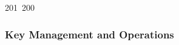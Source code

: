 201~200~\documentclass{article}
\begin{document}
\begin{itemize}
	                                                                                                                                                                                                                                                                                                	                                                                                                                                        	    	                                                                                                	                                                                                                                                                                                                                                                                                                                                	                                                                        	                                                                        	                                                                                                                                        	                                                                                                                                                                                    \end{itemize}

	                                                                                                                                                                                                                                                                                                	                                                                                                                                        	    	                                                                                                	                                                                                                                                                                                                                                                                                                                                	                                                                        	                                                                        	                                                                                                                                        	                                                                                                                                                                                    \subsubsection{Key Management and Operations}
\end{document}
